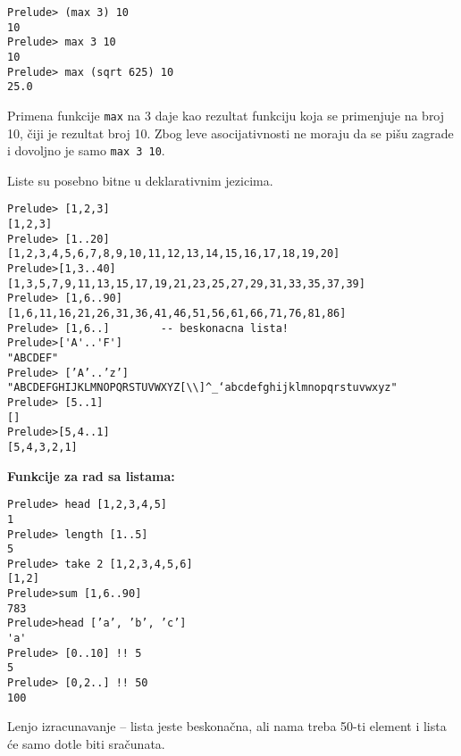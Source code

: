\documentclass[../main.tex]{subfiles}
\begin{document}
\begin{multicols}{2}

\begin{boxprimer}%
\begin{Verbatim}
Prelude> (max 3) 10
10
Prelude> max 3 10
10
Prelude> max (sqrt 625) 10
25.0
\end{Verbatim}
\end{boxprimer}

\columnbreak

Primena funkcije \texttt{max} na 3 daje kao rezultat funkciju koja se primenjuje na broj 10, čiji je rezultat broj 10. Zbog leve asocijativnosti ne moraju da se pišu zagrade i dovoljno je samo \texttt{max 3 10}.

\end{multicols}


Liste su posebno bitne u deklarativnim jezicima. 

\begin{boxprimer}[breakable]
\begin{Verbatim}
Prelude> [1,2,3]
[1,2,3]
Prelude> [1..20]
[1,2,3,4,5,6,7,8,9,10,11,12,13,14,15,16,17,18,19,20]
Prelude>[1,3..40]
[1,3,5,7,9,11,13,15,17,19,21,23,25,27,29,31,33,35,37,39]
Prelude> [1,6..90]
[1,6,11,16,21,26,31,36,41,46,51,56,61,66,71,76,81,86]
Prelude> [1,6..]		-- beskonacna lista!
Prelude>['A'..'F']
"ABCDEF"
Prelude> [’A’..’z’]
"ABCDEFGHIJKLMNOPQRSTUVWXYZ[\\]^_‘abcdefghijklmnopqrstuvwxyz"
Prelude> [5..1]
[]
Prelude>[5,4..1]
[5,4,3,2,1]

\end{Verbatim}
\end{boxprimer}

\begin{multicols}{2}
{\bf Funkcije za rad sa listama:}
\begin{boxprimer}[breakable]
\begin{Verbatim}
Prelude> head [1,2,3,4,5]
1
Prelude> length [1..5]
5
Prelude> take 2 [1,2,3,4,5,6]
[1,2]
Prelude>sum [1,6..90]
783
Prelude>head [’a’, ’b’, ’c’]
'a'
Prelude> [0..10] !! 5
5
Prelude> [0,2..] !! 50
100
\end{Verbatim}
Lenjo izracunavanje -- lista jeste beskonačna, ali nama treba 50-ti element i lista će samo dotle biti sračunata.
\end{boxprimer}

\end{multicols}
\end{document}
